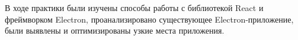 \conclusion

В ходе практики были изучены способы работы с библиотекой React и фреймворком Electron, проанализировано существующее Electron-приложение, были выявлены и оптимизированы узкие места приложения.